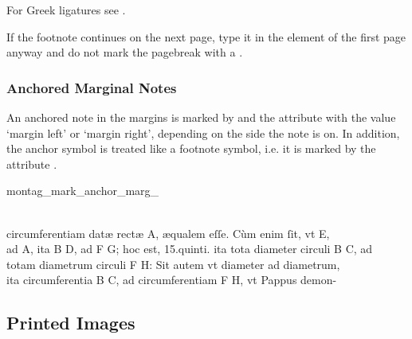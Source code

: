 \begin{crossref}
For Greek ligatures see .
\end{crossref}

\begin{note}
If the footnote continues on the next page, type it in the  element of the first page anyway and do not mark the pagebreak with a .
\end{note}

\subsubsection{Anchored Marginal Notes}
\label{section anchored marginal notes}

\begin{mainruleLessImportant}
An anchored note in the margins is marked by  and the attribute  with the value `margin left' or `margin right', depending on the side the note is on. In addition, the anchor symbol is treated like a footnote symbol, i.e. it is marked by the attribute .
\end{mainruleLessImportant}

\begin{sampleImage}{montag_mark_anchor_marg_} %
\begin{typeLatin}
 \someText \\
circumferentiam datæ rectæ A, æqualem eſſe. Cùm enim ſit, vt E, \\
ad A, ita B D, ad F G; hoc est, 15.\lwr{}quinti. ita tota diameter circuli B C, ad \\
totam diametrum circuli F H: Sit autem vt diameter ad diametrum, \\
ita circumferentia B C, ad circumferentiam F H, vt Pappus demon-  \\
\someText {}
\end{typeLatin}
\end{sampleImage}

\label{section anchored comments}

\tocspace
\subsection{Printed Images}


